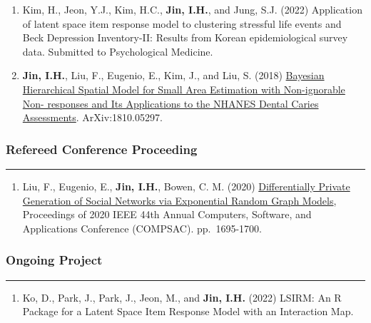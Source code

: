 \documentclass[
]{book}
\providecommand{\tightlist}{%
  \setlength{\itemsep}{0pt}\setlength{\parskip}{0pt}}
\begin{document}
\begin{enumerate}
\item
  Kim, H., Jeon, Y.J., Kim, H.C., \textbf{Jin, I.H.}, and Jung, S.J. (2022) Application of latent space item response model to clustering stressful life events and Beck Depression Inventory-II: Results from Korean epidemiological survey data. Submitted to Psychological Medicine.
\item
  \textbf{Jin, I.H.}, Liu, F., Eugenio, E., Kim, J., and Liu, S. (2018) \href{https://arxiv.org/abs/1810.05297}{Bayesian Hierarchical Spatial Model for Small Area Estimation with Non-ignorable Non- responses and Its Applications to the NHANES Dental Caries Assessments}. ArXiv:1810.05297.
\end{enumerate}

\hypertarget{refereed-conference-proceeding}{%
\subsubsection*{Refereed Conference Proceeding}\label{refereed-conference-proceeding}}

\begin{center}\rule{0.5\linewidth}{0.5pt}\end{center}

\begin{enumerate}
\def\labelenumi{\arabic{enumi}.}
\tightlist
\item
  Liu, F., Eugenio, E., \textbf{Jin, I.H.}, Bowen, C. M. (2020) \href{https://www.researchgate.net/publication/345376724_Differentially_Private_Generation_of_Social_Networks_via_Exponential_Random_Graph_Models}{Differentially Private Generation of Social Networks via Exponential Random Graph Models}, Proceedings of 2020 IEEE 44th Annual Computers, Software, and Applications Conference (COMPSAC). pp.~1695-1700.
\end{enumerate}

\hypertarget{ongoing-project}{%
\subsubsection*{Ongoing Project}\label{ongoing-project}}

\begin{center}\rule{0.5\linewidth}{0.5pt}\end{center}

\begin{enumerate}
\def\labelenumi{\arabic{enumi}.}
\tightlist
\item
  Ko, D., Park, J., Park, J., Jeon, M., and \textbf{Jin, I.H.} (2022) LSIRM: An R Package for a Latent Space Item Response Model with an Interaction Map.
\end{enumerate}
\end{document}
